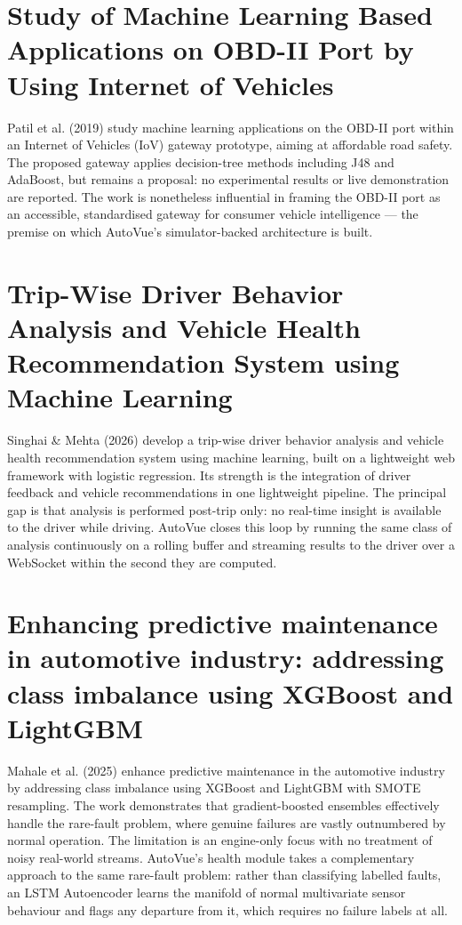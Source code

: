 \documentclass[10pt,a4paper]{report}
\begin{document}
\section{Study of Machine Learning Based Applications on OBD-II Port by Using Internet of Vehicles}

Patil et al. (2019) \cite{article6} study machine learning applications on the OBD-II port within an Internet of Vehicles (IoV) gateway prototype, aiming at affordable road safety. The proposed gateway applies decision-tree methods including J48 and AdaBoost, but remains a proposal: no experimental results or live demonstration are reported. The work is nonetheless influential in framing the OBD-II port as an accessible, standardised gateway for consumer vehicle intelligence — the premise on which AutoVue's simulator-backed architecture is built.

\section{Trip-Wise Driver Behavior Analysis and Vehicle Health Recommendation System using Machine Learning}

Singhai \& Mehta (2026) \cite{article12} develop a trip-wise driver behavior analysis and vehicle health recommendation system using machine learning, built on a lightweight web framework with logistic regression. Its strength is the integration of driver feedback and vehicle recommendations in one lightweight pipeline. The principal gap is that analysis is performed post-trip only: no real-time insight is available to the driver while driving. AutoVue closes this loop by running the same class of analysis continuously on a rolling buffer and streaming results to the driver over a WebSocket within the second they are computed.

\section{Enhancing predictive maintenance in automotive industry: addressing class imbalance using XGBoost and LightGBM}

Mahale et al. (2025) \cite{article7} enhance predictive maintenance in the automotive industry by addressing class imbalance using XGBoost and LightGBM with SMOTE resampling. The work demonstrates that gradient-boosted ensembles effectively handle the rare-fault problem, where genuine failures are vastly outnumbered by normal operation. The limitation is an engine-only focus with no treatment of noisy real-world streams. AutoVue's health module takes a complementary approach to the same rare-fault problem: rather than classifying labelled faults, an LSTM Autoencoder learns the manifold of normal multivariate sensor behaviour and flags any departure from it, which requires no failure labels at all.
\end{document}
